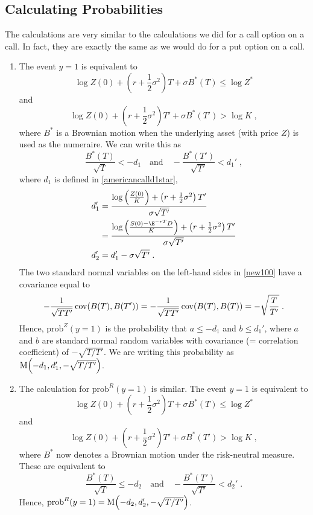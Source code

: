\subsection*{Calculating Probabilities}
The calculations are very similar to the calculations we did for a call option on a call.  In fact, they are exactly the same as we would do for a put option on a call.
\begin{enumerate}
\item The event $y=1$ is equivalent to
$$\log Z(0) + \left(r+\frac{1}{2}\sigma^2\right)T+\sigma B^*(T) \leq \log Z^*$$
and
$$\log Z(0) + \left(r+\frac{1}{2}\sigma^2\right)T'+\sigma B^*(T') > \log K\; ,$$
where $B^*$ is a Brownian motion when the underlying asset (with price $Z$) is used as the numeraire. 
We can write this as
\begin{equation}\label{new100}
\frac{B^*(T)}{\sqrt{T}} < -d_1 \quad \text{and} \quad - \frac{B^*(T')}{\sqrt{T'}} < d_1'\;,
\end{equation}
where $d_1$ is defined in \eqref{americancalld1star},
\begin{subequations}\label{americancallcombined}
\begin{align}
d_1' &= \frac{\log\left(\frac{Z(0)}{K}\right)+\left(r+\frac{1}{2}\sigma^2\right)T'}{\sigma\sqrt{T'}}\notag\\
&= \frac{\log\left(\frac{S(0)-\E^{-rT}D}{K}\right)+\left(r+\frac{1}{2}\sigma^2\right)T'}{\sigma\sqrt{T'}}\label{americancalld1}\\
d_2'&=d_1'-\sigma\sqrt{T'}\;.\label{americancalld2}
\end{align}\end{subequations}
The two standard normal variables on the left-hand sides in \eqref{new100} have a covariance equal to
$$-\frac{1}{\sqrt{TT'}}\operatorname{cov}(B(T),B(T')) = -\frac{1}{\sqrt{TT'}}\operatorname{cov}(B(T),B(T)) = -\sqrt{\frac{T}{T'}}\; .$$
Hence, $\text{prob}^Z(y=1)$ is the probability that $a\leq -d_1$ and $b\leq d_1'$, where $a$ and $b$ are standard normal random variables with covariance (= correlation coefficient) of $-\sqrt{T/T'}$.  We are writing this probability as $\operatorname{M}\!\left(-d_1,d_1',-\sqrt{T/T'}\right)$.  

\item The calculation for $\text{prob}^R(y=1)$ is similar.  The event $y=1$
is equivalent to
$$\log Z(0) + \left(r+\frac{1}{2}\sigma^2\right)T+\sigma B^*(T) \leq \log Z^*$$
and
$$\log Z(0) + \left(r+\frac{1}{2}\sigma^2\right)T'+\sigma B^*(T') > \log K\; ,$$
where $B^*$ now denotes a Brownian motion under the risk-neutral measure.  These are equivalent to
\begin{equation}\label{new11}
\frac{B^*(T)}{\sqrt{T}} \leq -d_2 \quad \text{and} \quad - \frac{B^*(T')}{\sqrt{T'}} < d_2'\;.
\end{equation}
Hence, $\text{prob}^R(y=1)=\operatorname{M}\!\left(-d_2,d_2',-\sqrt{T/T'}\right)$.  
\end{enumerate}

